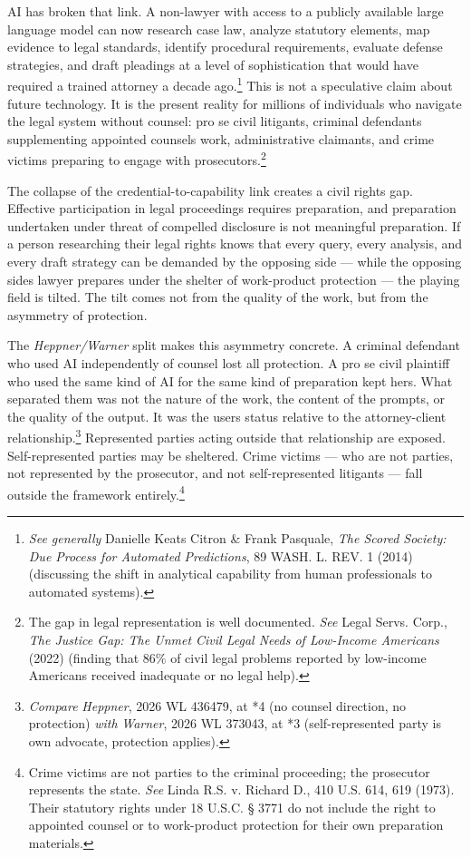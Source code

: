 \documentclass[
  12pt,
]{article}
\begin{document}
AI has broken that link. A non-lawyer with access to a publicly
available large language model can now research case law, analyze
statutory elements, map evidence to legal standards, identify procedural
requirements, evaluate defense strategies, and draft pleadings at a
level of sophistication that would have required a trained attorney a
decade ago.\footnote{\emph{See generally} Danielle Keats Citron \& Frank
  Pasquale, \emph{The Scored Society: Due Process for Automated
  Predictions}, 89 WASH. L. REV. 1 (2014) (discussing the shift in
  analytical capability from human professionals to automated systems).}
This is not a speculative claim about future technology. It is the
present reality for millions of individuals who navigate the legal
system without counsel: pro se civil litigants, criminal defendants
supplementing appointed counsel\textquotesingle s work, administrative
claimants, and crime victims preparing to engage with
prosecutors.\footnote{The gap in legal representation is well
  documented. \emph{See} Legal Servs. Corp., \emph{The Justice Gap: The
  Unmet Civil Legal Needs of Low-Income Americans} (2022) (finding that
  86\% of civil legal problems reported by low-income Americans received
  inadequate or no legal help).}

The collapse of the credential-to-capability link creates a civil
rights gap. Effective participation in legal proceedings requires
preparation, and preparation undertaken under threat of compelled
disclosure is not meaningful preparation. If a person researching their
legal rights knows that every query, every analysis, and every draft
strategy can be demanded by the opposing side --- while the opposing
side\textquotesingle s lawyer prepares under the shelter of work-product
protection --- the playing field is tilted. The tilt comes not from the
quality of the work, but from the asymmetry of protection.

The \emph{Heppner/Warner} split makes this asymmetry concrete. A
criminal defendant who used AI independently of counsel lost all
protection. A pro se civil plaintiff who used the same kind of AI for
the same kind of preparation kept hers. What separated them was not the
nature of the work, the content of the prompts, or the quality of the
output. It was the user\textquotesingle s status relative to the
attorney-client relationship.\footnote{\emph{Compare} \emph{Heppner},
  2026 WL 436479, at *4 (no counsel direction, no protection)
  \emph{with} \emph{Warner}, 2026 WL 373043, at *3 (self-represented
  party is own advocate, protection applies).} Represented parties
acting outside that relationship are exposed. Self-represented parties
may be sheltered. Crime victims --- who are not parties, not represented
by the prosecutor, and not self-represented litigants --- fall outside
the framework entirely.\footnote{Crime victims are not parties to the
  criminal proceeding; the prosecutor represents the state. \emph{See}
  Linda R.S. v. Richard D., 410 U.S. 614, 619 (1973). Their statutory
  rights under 18 U.S.C. § 3771 do not include the right to appointed
  counsel or to work-product protection for their own preparation
  materials.}
\end{document}
